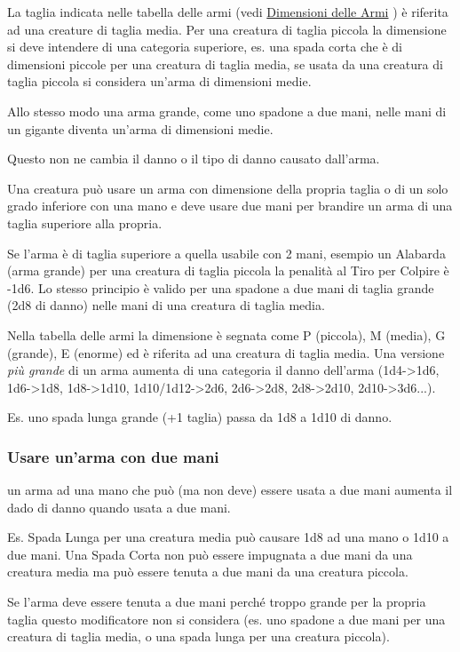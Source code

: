 \begin{multicols}{2}
La taglia indicata nelle tabella delle armi (vedi \hyperlink{dimensionediunarma}{Dimensioni delle Armi} ) è riferita ad una creature di taglia media. Per una creatura di taglia piccola la dimensione si deve intendere di una categoria superiore, es. una spada corta che è di dimensioni piccole per una creatura di taglia media, se usata da una creatura di taglia piccola si considera un'arma di dimensioni medie.

Allo stesso modo una arma grande, come uno spadone a due mani, nelle mani di un gigante diventa un'arma di dimensioni medie.

Questo non ne cambia il danno o il tipo di danno causato dall'arma.

Una creatura può usare un arma con dimensione della propria taglia o di un solo grado inferiore con una mano e deve usare due mani per brandire un arma di una taglia superiore alla propria.

Se l'arma è di taglia superiore a quella usabile con 2 mani, esempio un Alabarda (arma grande) per una creatura di taglia piccola la penalità al Tiro per Colpire è -1d6. Lo stesso principio è valido per una spadone a due mani di taglia grande (2d8 di danno) nelle mani di una creatura di taglia media.

Nella tabella delle armi la dimensione è segnata come P (piccola), M (media), G (grande), E (enorme) ed è riferita ad una creatura di taglia media. Una versione \emph{più grande} di un arma aumenta di una categoria il danno dell'arma (1d4->1d6, 1d6->1d8, 1d8->1d10, 1d10/1d12->2d6, 2d6->2d8, 2d8->2d10, 2d10->3d6...).

Es. uno spada lunga grande (+1 taglia) passa da 1d8 a 1d10 di danno.


\subsubsection{Usare un'arma con due mani} \label{usarearmaconduemani}

un arma ad una mano che può (ma non deve) essere usata a due mani aumenta il dado di danno quando usata a due mani.

Es. Spada Lunga per una creatura media può causare 1d8 ad una mano o 1d10 a due mani. Una Spada Corta non può essere impugnata a due mani da una creatura media ma può essere tenuta a due mani da una creatura piccola.

Se l'arma deve essere tenuta a due mani perché troppo grande per la propria taglia questo modificatore non si considera (es. uno spadone a due mani per una creatura di taglia media, o una spada lunga per una creatura piccola).


\end{multicols}
